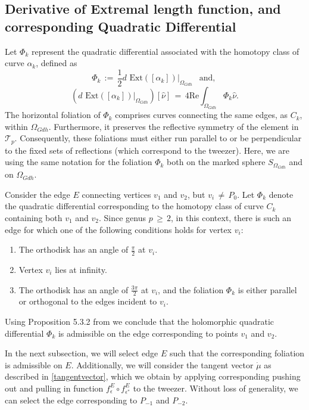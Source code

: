 \documentclass[12pt,epsfig,tikz,multi]{amsart}
\numberwithin{equation}{section}
\begin{document}
\subsection{Derivative of Extremal length function, and corresponding Quadratic Differential}

Let $\Phi_k$ represent the quadratic differential associated with the homotopy class of curve $\alpha_k$, defined as
$$
\Phi_k\,:=\, \frac{1}{2} d\text{ Ext}([\alpha_k])|_{\Omega_{Gdh}}\ \  \text{ and, }
$$
\begin{equation}\label{eqn:derivativeofExtermal}
    \left(d\text{ Ext}([\alpha_k])|_{\Omega_{Gdh}}\right)[\widehat{\nu}] \,=\, 4\text{Re}\int_{\Omega_{Gdh}}
\Phi_k\widehat{\nu}.
\end{equation}
The horizontal foliation of $\Phi_k$ comprises curves connecting the same edges, as $C_k$, within $\Omega_{Gdh}$. Furthermore, it preserves the reflective symmetry of the element in $\mathcal{T}_p$. Consequently, these foliations must either run parallel to or be perpendicular to the fixed sets of reflections (which correspond to the tweezer).  Here, we are using the same notation for the foliation $\Phi_k$ both on the marked sphere $S_{\Omega_{Gdh}}$ and on $\Omega_{Gdh}$.

Consider the edge $E$ connecting vertices $v_1$ and $v_2$, but $v_i\,\neq\, P_0$. Let $\Phi_k$ denote the quadratic differential 
corresponding to the homotopy class of curve $C_k$ containing both $v_1$ and $v_2$.  Since genus $p\,\geq\, 2$, in this context, there is 
such an edge for which one of the following conditions holds for vertex $v_i$:
\begin{enumerate}
    \item The orthodisk has an angle of $\frac{\pi}{2}$ at $v_i$.
    \item Vertex $v_i$ lies at infinity.
    \item The orthodisk has an angle of $\frac{3\pi}{2}$ at $v_i$, and the foliation $\Phi_k$ is either parallel or orthogonal to the edges incident to $v_i$.
\end{enumerate} 

Using Proposition 5.3.2 from \cite{Weber1998TeichmullerTA} we conclude that the holomorphic quadratic differential $\Phi_k$ is 
admissible on the edge corresponding to points $v_1$ and $v_2$.

In the next subsection, we will select edge $E$ such that the corresponding foliation is admissible on $E$. Additionally, we will 
consider the tangent vector $\dot{\mu}$ as described in \eqref{tangentvector}, which we obtain by applying corresponding pushing out and pulling in function 
$f_\epsilon^E \circ f_{\epsilon^*}^E$ to the tweezer.  Without loss of generality, we can select the edge corresponding to $P_{-1}$ and 
$P_{-2}$.
\end{document}
